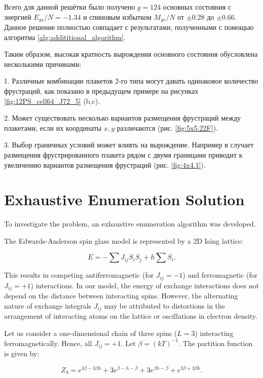 \documentclass[utf8, babel, sor, jor, amsmath, amssymb, reprint]{elsarticle} %
\begin{document}
Всего для данной решётки было получено $g=124$ основных состояния с энергией $E_{gs}/N=-1.34$ и спиновым избытком $M_{gs}/N$ от $\pm 0.28$ до $\pm 0.66$. Данное решение полностью совпадает с результатами, полученными с помощью алгоритма \ref{alg:addititional_algorithm}.

Таким образом, высокая кратность вырождения основного состояния обусловлена несколькими причинами:

1. Различные комбинации плакетов 2-го типа могут давать одинаковое количество фрустраций, как показано в предыдущем примере на рисунках \ref{fig:12PS_cell64_J72_5} (b,c).

2. Может существовать несколько вариантов размещения фрустраций между плакетами, если их координаты $x,y$ различаются (рис. \ref{fig:5x5.22F}).

3. Выбор граничных условий может влиять на вырождение. Например в случает размещения фрустрированного плакета рядом с двумя границами приводит к увеличению вариантов размещения фрустраций (рис. \ref{fig:4x4.1}).



\section{Exhaustive Enumeration Solution}

To investigate the problem, an exhaustive enumeration algorithm was developed.

The Edwards-Anderson spin glass model is represented by a 2D Ising lattice:

\begin{equation}
	E = -\sum J_{ij} S_i S_j + h \sum S_i.
	\label{eq:ising_energy}
\end{equation}

This results in competing antiferromagnetic (for $J_{ij} = -1$) and ferromagnetic (for $J_{ij} = +1$) interactions. In our model, the energy of exchange interactions does not depend on the distance between interacting spins. However, the alternating nature of exchange integrals $J_{ij}$ may be attributed to distortions in the arrangement of interacting atoms on the lattice or oscillations in electron density.

Let us consider a one-dimensional chain of three spins ($L = 3$) interacting ferromagnetically. Hence, all $J_{ij} = +1$. Let $\beta = (kT)^{-1}$. The partition function is given by:

\begin{equation}
	Z_3 = e^{3\beta - 3\beta h} + 3e^{\beta - h - \beta} + 3e^{\beta h - \beta} + e^{3\beta + 3\beta h}.
	\label{eq:stat_3}
\end{equation}
\end{document}
